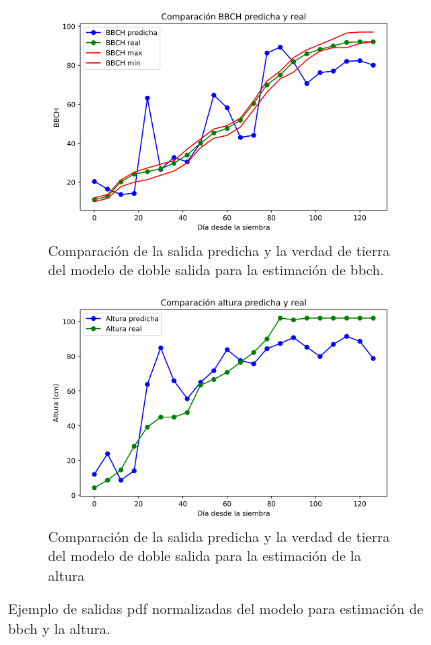 \begin{figure}[H]
\centering
\begin{subfigure}{\textwidth}
  \centering
  \includegraphics[width=0.95\linewidth]{archivos/tfg/Mean/TEST_PARC_FINAL_BH}
  \caption{Comparación de la salida predicha y la verdad de tierra del modelo de doble salida para la estimación de \gls{bbch}. \label{fig:sub_c1}}
\end{subfigure}
\begin{subfigure}{\textwidth}
  \centering
  \includegraphics[width=0.95\linewidth]{archivos/tfg/Mean/TEST_PARC_FINAL_BH_H}
  \caption{Comparación de la salida predicha y la verdad de tierra del modelo de doble salida para la estimación de la altura\label{fig:sub_c2}}
\end{subfigure}
\caption{Ejemplo de salidas \gls{pdf} normalizadas del modelo para estimación de \gls{bbch} y la altura. \label{fig:comp_bh}}
\end{figure}

